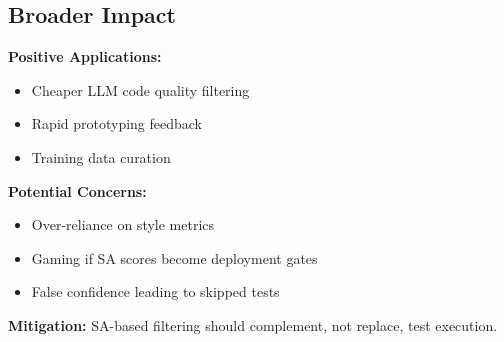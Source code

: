 \subsection{Broader Impact}

\textbf{Positive Applications:}
\begin{itemize}
\item Cheaper LLM code quality filtering
\item Rapid prototyping feedback
\item Training data curation
\end{itemize}

\textbf{Potential Concerns:}
\begin{itemize}
\item Over-reliance on style metrics
\item Gaming if SA scores become deployment gates
\item False confidence leading to skipped tests
\end{itemize}

\textbf{Mitigation:} SA-based filtering should complement, not replace, test execution.
